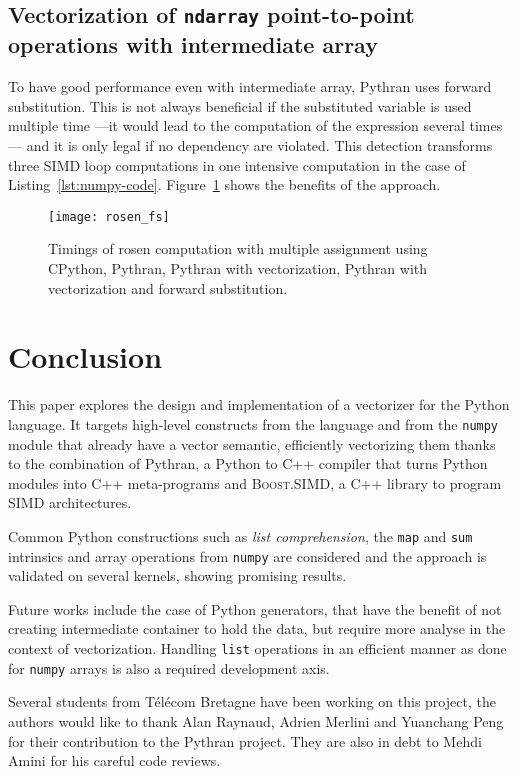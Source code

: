 \documentclass[preprint]{sigplanconf}
\providecommand{\boostsimd}{\textsc{Boost.SIMD}}
\begin{document}
\subsection{Vectorization of \texttt{ndarray} point-to-point operations with
intermediate array}

To have good performance even with intermediate array, Pythran uses forward
substitution. This is not always beneficial if the substituted variable is used multiple time ---it
would lead to the computation of the expression several times--- and it is only legal if no dependency are violated. This detection
transforms three SIMD loop computations in one intensive computation in the case of Listing~\ref{lst:numpy-code}. Figure~\ref{fig:numpy-code-fs} shows the benefits of the approach.

\begin{figure}[ht]

    \texttt{[image: rosen\_fs]}
    \caption{Timings of rosen computation with multiple assignment using CPython, Pythran, Pythran with vectorization, Pythran with vectorization and forward substitution.}
    \label{fig:numpy-code-fs}

\end{figure}

\section*{Conclusion}

This paper explores the design and implementation of a vectorizer for the
Python language. It targets high-level constructs from the language and from
the \texttt{numpy} module that already have a vector semantic, efficiently
vectorizing them thanks to the combination of Pythran, a Python to C++ compiler
that turns Python modules into C++ meta-programs and \boostsimd, a C++ library
to program SIMD architectures.

Common Python constructions such as \emph{list comprehension}, the \texttt{map}
and \texttt{sum} intrinsics and array operations from \texttt{numpy} are
considered and the approach is validated on several kernels, showing
promising results.

Future works include the case of Python generators, that have the benefit of not
creating intermediate container to hold the data, but require more analyse in
the context of vectorization. Handling \texttt{list} operations in an efficient
manner as done for \texttt{numpy} arrays is also a required development axis.

\acks

Several students from T{\'e}l{\'e}com Bretagne have been working on this project, the
authors would like to thank Alan Raynaud, Adrien Merlini and Yuanchang Peng for
their contribution to the Pythran project. They are also in debt to Mehdi
Amini for his careful code reviews.





\end{document}

